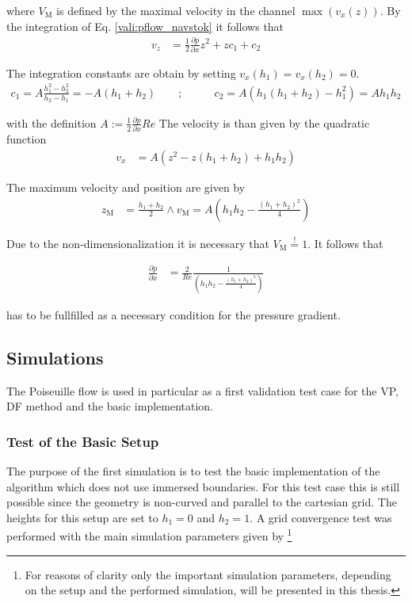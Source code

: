 where $V_\text{M}$ is defined by the maximal velocity in the channel $\max(v_x(z))$.
By the integration of Eq. \ref{vali:pflow_navstok} it follows that
\begin{align}
v_z &= \frac{1}{2}\frac{\partial p}{\partial x}z^2 + zc_1 + c_2
\end{align}

The integration constants are obtain by setting $v_x(h_1) = v_x(h_2) = 0$.
\begin{align}
c_1 = A\frac{h_1^2 -h_2^2}{h_2 - h_1} = -A(h_1+h_2)\qquad ;& \qquad
c_2 = A(h_1(h_1 + h_2) - h_1^2) = Ah_1h_2
\end{align}

with the definition $A:=\frac{1}{2}\frac{\partial p}{\partial x} Re$
The velocity is than given by the quadratic function
\begin{align}
\label{vali:pflow_theosol}
v_x &= A(z^2 - z(h_1 + h_2) + h_1h_2)
\end{align}

The maximum velocity and position are given by
\begin{align}
z_{\text{M}} &= \frac{h_1+h_2}{2} \wedge v_{\text{M}} = A\left(h_1h_2 - \frac{(h_1 + h_2)^2}{4}\right)
\end{align}

Due to the non-dimensionalization it is necessary that $V_{\text{M}} \overset{!}{=}  1$.
It follows that

\begin{align}
\frac{\partial p}{\partial x} &= \frac{2}{Re}\frac{1}{\left(h_1h_2 - \frac{(h_1+h_2)^2}{4} \right)}
\end{align}

has to be fullfilled as a necessary condition for the pressure gradient.

\subsection{Simulations}

The Poiseuille flow is used in particular as a first validation test case
for the VP, DF method  and the basic implementation.

\subsubsection{Test of the Basic Setup}

The purpose of the first simulation is to test  the basic
implementation of the algorithm which does not use immersed boundaries.
For this test case this is still possible since the geometry is non-curved
and parallel to the cartesian grid. The heights for this setup are set to $h_1=0$ and $h_2=1$.
A grid convergence test was performed with the main simulation parameters given by
\footnote{For reasons of clarity only the important simulation parameters, depending on the setup and the performed simulation,  will be presented in this thesis.}


